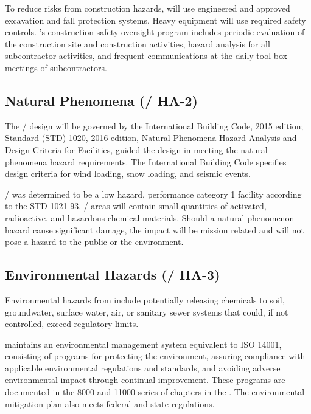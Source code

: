 To reduce risks from construction hazards, \fnal will use
engineered and approved excavation and fall protection systems.  Heavy
equipment will use required safety controls. \fnal's
construction safety oversight program includes periodic evaluation of
the construction site and construction activities, hazard analysis for
all subcontractor activities, and frequent  communications at the
daily tool box meetings of subcontractors.

\subsection{Natural Phenomena (/ HA-2)}

The / design will be governed by the International Building
Code, 2015 edition;  Standard (STD)-1020, 2016 edition,
Natural Phenomena Hazard Analysis and Design Criteria for 
Facilities, guided the design in meeting the
natural phenomena hazard requirements.  The International Building Code specifies design
criteria for wind loading, snow loading, and seismic events.

/ was determined to be a low hazard,
performance category 1 facility according to the 
STD-1021-93. / areas will contain small
quantities of activated, radioactive, and hazardous chemical
materials. Should a natural phenomenon hazard cause significant
damage, the impact will be mission related and will not pose a hazard
to the public or the environment.

\subsection{Environmental Hazards (/ HA-3)}

Environmental hazards from  include potentially releasing
chemicals to soil, groundwater, surface water, air, or sanitary sewer
systems that could, if not controlled, exceed regulatory limits.

\fnal maintains an environmental management system equivalent to
ISO 14001, consisting of programs for protecting the environment,
assuring compliance with applicable environmental regulations and
standards, and avoiding adverse environmental impact through continual improvement.  These programs are documented in the 8000
and 11000 series of chapters in the .  The environmental
mitigation plan also meets federal and state regulations.


